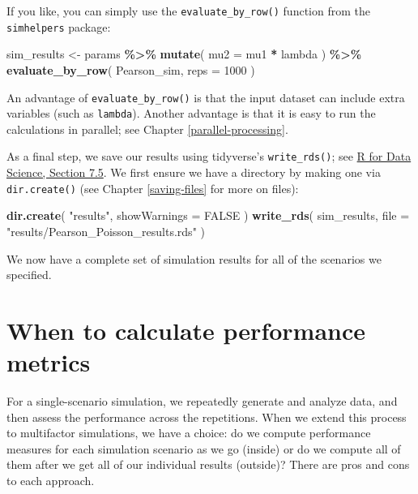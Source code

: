 \documentclass[
]{book}
\newenvironment{Shaded}{\begin{snugshade}}{\end{snugshade}}
\newcommand{\AttributeTok}[1]{\textcolor[rgb]{0.13,0.29,0.53}{#1}}
\newcommand{\ConstantTok}[1]{\textcolor[rgb]{0.56,0.35,0.01}{#1}}
\newcommand{\DecValTok}[1]{\textcolor[rgb]{0.00,0.00,0.81}{#1}}
\newcommand{\FunctionTok}[1]{\textcolor[rgb]{0.13,0.29,0.53}{\textbf{#1}}}
\newcommand{\NormalTok}[1]{#1}
\newcommand{\OtherTok}[1]{\textcolor[rgb]{0.56,0.35,0.01}{#1}}
\newcommand{\SpecialCharTok}[1]{\textcolor[rgb]{0.81,0.36,0.00}{\textbf{#1}}}
\newcommand{\StringTok}[1]{\textcolor[rgb]{0.31,0.60,0.02}{#1}}
\begin{document}
If you like, you can simply use the \texttt{evaluate\_by\_row()} function from the \texttt{simhelpers} package:

\begin{Shaded}
\begin{Highlighting}[]
\NormalTok{sim\_results }\OtherTok{\textless{}{-}} 
\NormalTok{  params }\SpecialCharTok{\%\textgreater{}\%}
  \FunctionTok{mutate}\NormalTok{( }\AttributeTok{mu2 =}\NormalTok{ mu1 }\SpecialCharTok{*}\NormalTok{ lambda ) }\SpecialCharTok{\%\textgreater{}\%}
  \FunctionTok{evaluate\_by\_row}\NormalTok{( Pearson\_sim, }\AttributeTok{reps =} \DecValTok{1000}\NormalTok{ )}
\end{Highlighting}
\end{Shaded}

An advantage of \texttt{evaluate\_by\_row()} is that the input dataset can include extra variables (such as \texttt{lambda}).
Another advantage is that it is easy to run the calculations in parallel; see Chapter \ref{parallel-processing}.

As a final step, we save our results using tidyverse's \texttt{write\_rds()}; see \href{https://r4ds.hadley.nz/data-import.html\#sec-writing-to-a-file}{R for Data Science, Section 7.5}.
We first ensure we have a directory by making one via \texttt{dir.create()} (see Chapter \ref{saving-files} for more on files):

\begin{Shaded}
\begin{Highlighting}[]
\FunctionTok{dir.create}\NormalTok{( }\StringTok{"results"}\NormalTok{, }\AttributeTok{showWarnings =} \ConstantTok{FALSE}\NormalTok{ )}
\FunctionTok{write\_rds}\NormalTok{( sim\_results, }\AttributeTok{file =} \StringTok{"results/Pearson\_Poisson\_results.rds"}\NormalTok{ )}
\end{Highlighting}
\end{Shaded}

We now have a complete set of simulation results for all of the scenarios we specified.

\section{When to calculate performance metrics}\label{when-to-calculate-performance-metrics}

For a single-scenario simulation, we repeatedly generate and analyze data, and then assess the performance across the repetitions.
When we extend this process to multifactor simulations, we have a choice: do we compute performance measures for each simulation scenario as we go (inside) or do we compute all of them after we get all of our individual results (outside)?
There are pros and cons to each approach.
\end{document}
